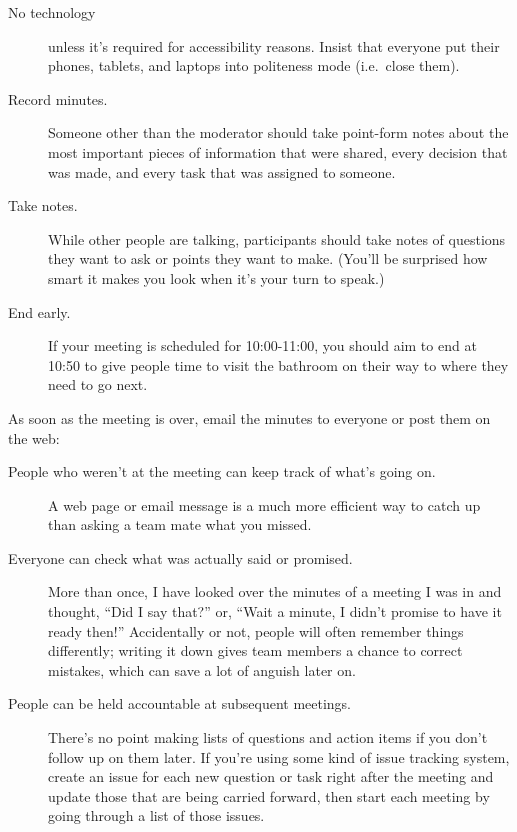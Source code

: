 \begin{description}
\item[No technology]
  unless it's required for accessibility reasons.
  Insist that everyone put their phones, tablets, and laptops into politeness mode
  (i.e.\ close them).

\item[Record minutes.]
  Someone other than the moderator should take point-form notes about
  the most important pieces of information that were shared,
  every decision that was made,
  and every task that was assigned to someone.

\item[Take notes.]
  While other people are talking,
  participants should take notes of questions they want to ask or points they want to make.
  (You'll be surprised how smart it makes you look when it's your turn to speak.)

\item[End early.]
  If your meeting is scheduled for 10:00-11:00,
  you should aim to end at 10:50 to give people time to visit the bathroom
  on their way to where they need to go next.

\end{description}

As soon as the meeting is over,
email the minutes to everyone or post them on the web:

\begin{description}

\item[People who weren't at the meeting can keep track of what's going on.]
  A web page or email message is a much more efficient way to catch up
  than asking a team mate what you missed.

\item[Everyone can check what was actually said or promised.]
  More than once,
  I have looked over the minutes of a meeting I was in
  and thought, ``Did I say that?''
  or, ``Wait a minute, I didn't promise to have it ready then!''
  Accidentally or not,
  people will often remember things differently;
  writing it down gives team members a chance to correct mistakes,
  which can save a lot of anguish later on.

\item[People can be held accountable at subsequent meetings.]
  There's no point making lists of questions and action items
  if you don't follow up on them later.
  If you're using some kind of issue tracking system,
  create an issue for each new question or task right after the meeting
  and update those that are being carried forward,
  then start each meeting by going through a list of those issues.

\end{description}

